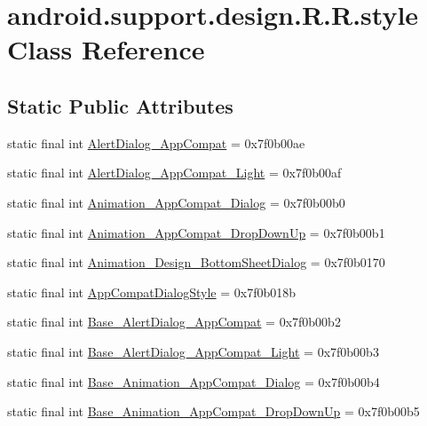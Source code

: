 \hypertarget{classandroid_1_1support_1_1design_1_1_r_1_1style}{
\section{android.support.design.R.R.style Class Reference}
\label{classandroid_1_1support_1_1design_1_1_r_1_1style}
}
\subsection*{Static Public Attributes}
\begin{CompactItemize}
\item 
static final int \hyperlink{classandroid_1_1support_1_1design_1_1_r_1_1style_5da40a69e338da6699ba1ed42460f1d4}{AlertDialog\_\-AppCompat} = 0x7f0b00ae
\item 
static final int \hyperlink{classandroid_1_1support_1_1design_1_1_r_1_1style_aef76d65be94eaa9dfc2e47bd8f016c7}{AlertDialog\_\-AppCompat\_\-Light} = 0x7f0b00af
\item 
static final int \hyperlink{classandroid_1_1support_1_1design_1_1_r_1_1style_439c4ecabd4d57e92638a8df414021c6}{Animation\_\-AppCompat\_\-Dialog} = 0x7f0b00b0
\item 
static final int \hyperlink{classandroid_1_1support_1_1design_1_1_r_1_1style_6ced00b7cb54c95e1df886386314b24f}{Animation\_\-AppCompat\_\-DropDownUp} = 0x7f0b00b1
\item 
static final int \hyperlink{classandroid_1_1support_1_1design_1_1_r_1_1style_36c971bfaa7033634268cbab51d14dcb}{Animation\_\-Design\_\-BottomSheetDialog} = 0x7f0b0170
\item 
static final int \hyperlink{classandroid_1_1support_1_1design_1_1_r_1_1style_ffea5fd0ed4aee713d5e89ff346b0bcf}{AppCompatDialogStyle} = 0x7f0b018b
\item 
static final int \hyperlink{classandroid_1_1support_1_1design_1_1_r_1_1style_ea370bd7dab298d8d6711e14da0978c8}{Base\_\-AlertDialog\_\-AppCompat} = 0x7f0b00b2
\item 
static final int \hyperlink{classandroid_1_1support_1_1design_1_1_r_1_1style_d7fffbecf0ec9dff87410539c1adfbba}{Base\_\-AlertDialog\_\-AppCompat\_\-Light} = 0x7f0b00b3
\item 
static final int \hyperlink{classandroid_1_1support_1_1design_1_1_r_1_1style_e7627c153b9c3dea8caf01745fc1c6c6}{Base\_\-Animation\_\-AppCompat\_\-Dialog} = 0x7f0b00b4
\item 
static final int \hyperlink{classandroid_1_1support_1_1design_1_1_r_1_1style_f65278b7bb0911df81fb338f356a0971}{Base\_\-Animation\_\-AppCompat\_\-DropDownUp} = 0x7f0b00b5

\end{CompactItemize}
